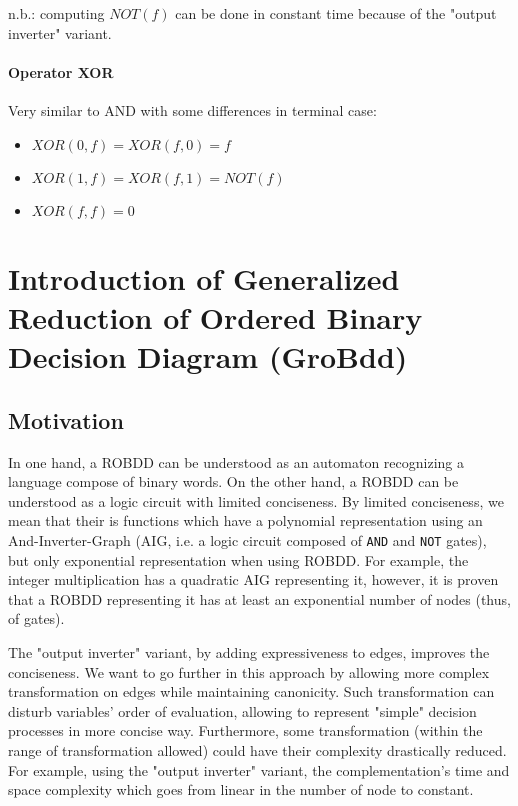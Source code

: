 \documentclass[a4paper,10pt]{article}
\begin{document}
n.b.: computing $NOT(f)$ can be done in constant time because of the "output inverter" variant.

\paragraph{Operator XOR}
Very similar to AND with some differences in terminal case:\begin{itemize}
\item $XOR(0, f) = XOR(f, 0) = f$
\item $XOR(1, f) = XOR(f, 1) = NOT(f)$
\item $XOR(f, f) = 0$
\end{itemize}

\section{Introduction of Generalized Reduction of Ordered Binary Decision Diagram (GroBdd)}

\subsection{Motivation}

In one hand, a ROBDD can be understood as an automaton recognizing a language compose of binary words.
On the other hand, a ROBDD can be understood as a logic circuit with limited conciseness.
By limited conciseness, we mean that their is functions which have a polynomial representation using an And-Inverter-Graph (AIG, i.e. a logic circuit composed of \texttt{AND} and \texttt{NOT} gates), but only exponential representation when using ROBDD.
For example, the integer multiplication has a quadratic AIG representing it, however, it is proven \cite{Bryant1986} that a ROBDD representing it has at least an exponential number of nodes (thus, of gates).

The "output inverter" variant, by adding expressiveness to edges, improves the conciseness.
We want to go further in this approach by allowing more complex transformation on edges while maintaining canonicity.
Such transformation can disturb variables' order of evaluation, allowing to represent "simple" decision processes in more concise way.
Furthermore, some transformation (within the range of transformation allowed) could have their complexity drastically reduced.
For example, using the "output inverter" variant, the complementation's time and space complexity which goes from linear in the number of node to constant.
\end{document}
